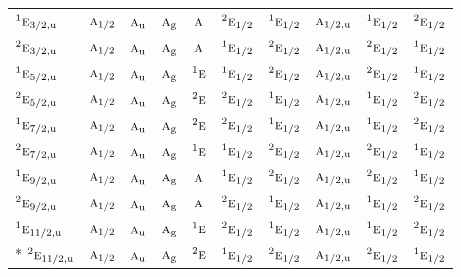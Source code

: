 \documentclass[10pt,a4paper]{article}
\numberwithin{equation}{section}
\newcommand{\irr}[1]{\text{\normalfont\scshape #1}}
\newcommand{\conjpair}[1]{{}^{#1}}
\newcommand{\ptag}[1]{\mathrm{#1}}
\begin{document}
{\begin{longtable}{@{}lccccccccc@{}}
$\conjpair{1}\irr{e}_{3/2,\ptag{u}}$ & $\irr{a}_{1/2}$ & $\irr{a}_{\ptag{u}}$ & $\irr{a}_{\ptag{g}}$ & $\irr{a}$ & $\conjpair{2}\irr{e}_{1/2}$ & $\conjpair{1}\irr{e}_{1/2}$ & $\irr{a}_{1/2,\ptag{u}}$ & $\conjpair{1}\irr{e}_{1/2}$ & $\conjpair{2}\irr{e}_{1/2}$\\
$\conjpair{2}\irr{e}_{3/2,\ptag{u}}$ & $\irr{a}_{1/2}$ & $\irr{a}_{\ptag{u}}$ & $\irr{a}_{\ptag{g}}$ & $\irr{a}$ & $\conjpair{1}\irr{e}_{1/2}$ & $\conjpair{2}\irr{e}_{1/2}$ & $\irr{a}_{1/2,\ptag{u}}$ & $\conjpair{2}\irr{e}_{1/2}$ & $\conjpair{1}\irr{e}_{1/2}$\\
$\conjpair{1}\irr{e}_{5/2,\ptag{u}}$ & $\irr{a}_{1/2}$ & $\irr{a}_{\ptag{u}}$ & $\irr{a}_{\ptag{g}}$ & $\conjpair{1}\irr{e}$ & $\conjpair{1}\irr{e}_{1/2}$ & $\conjpair{2}\irr{e}_{1/2}$ & $\irr{a}_{1/2,\ptag{u}}$ & $\conjpair{2}\irr{e}_{1/2}$ & $\conjpair{1}\irr{e}_{1/2}$\\
$\conjpair{2}\irr{e}_{5/2,\ptag{u}}$ & $\irr{a}_{1/2}$ & $\irr{a}_{\ptag{u}}$ & $\irr{a}_{\ptag{g}}$ & $\conjpair{2}\irr{e}$ & $\conjpair{2}\irr{e}_{1/2}$ & $\conjpair{1}\irr{e}_{1/2}$ & $\irr{a}_{1/2,\ptag{u}}$ & $\conjpair{1}\irr{e}_{1/2}$ & $\conjpair{2}\irr{e}_{1/2}$\\
$\conjpair{1}\irr{e}_{7/2,\ptag{u}}$ & $\irr{a}_{1/2}$ & $\irr{a}_{\ptag{u}}$ & $\irr{a}_{\ptag{g}}$ & $\conjpair{2}\irr{e}$ & $\conjpair{2}\irr{e}_{1/2}$ & $\conjpair{1}\irr{e}_{1/2}$ & $\irr{a}_{1/2,\ptag{u}}$ & $\conjpair{1}\irr{e}_{1/2}$ & $\conjpair{2}\irr{e}_{1/2}$\\
$\conjpair{2}\irr{e}_{7/2,\ptag{u}}$ & $\irr{a}_{1/2}$ & $\irr{a}_{\ptag{u}}$ & $\irr{a}_{\ptag{g}}$ & $\conjpair{1}\irr{e}$ & $\conjpair{1}\irr{e}_{1/2}$ & $\conjpair{2}\irr{e}_{1/2}$ & $\irr{a}_{1/2,\ptag{u}}$ & $\conjpair{2}\irr{e}_{1/2}$ & $\conjpair{1}\irr{e}_{1/2}$\\
$\conjpair{1}\irr{e}_{9/2,\ptag{u}}$ & $\irr{a}_{1/2}$ & $\irr{a}_{\ptag{u}}$ & $\irr{a}_{\ptag{g}}$ & $\irr{a}$ & $\conjpair{1}\irr{e}_{1/2}$ & $\conjpair{2}\irr{e}_{1/2}$ & $\irr{a}_{1/2,\ptag{u}}$ & $\conjpair{2}\irr{e}_{1/2}$ & $\conjpair{1}\irr{e}_{1/2}$\\
$\conjpair{2}\irr{e}_{9/2,\ptag{u}}$ & $\irr{a}_{1/2}$ & $\irr{a}_{\ptag{u}}$ & $\irr{a}_{\ptag{g}}$ & $\irr{a}$ & $\conjpair{2}\irr{e}_{1/2}$ & $\conjpair{1}\irr{e}_{1/2}$ & $\irr{a}_{1/2,\ptag{u}}$ & $\conjpair{1}\irr{e}_{1/2}$ & $\conjpair{2}\irr{e}_{1/2}$\\
$\conjpair{1}\irr{e}_{11/2,\ptag{u}}$ & $\irr{a}_{1/2}$ & $\irr{a}_{\ptag{u}}$ & $\irr{a}_{\ptag{g}}$ & $\conjpair{1}\irr{e}$ & $\conjpair{2}\irr{e}_{1/2}$ & $\conjpair{1}\irr{e}_{1/2}$ & $\irr{a}_{1/2,\ptag{u}}$ & $\conjpair{1}\irr{e}_{1/2}$ & $\conjpair{2}\irr{e}_{1/2}$\\*
$\conjpair{2}\irr{e}_{11/2,\ptag{u}}$ & $\irr{a}_{1/2}$ & $\irr{a}_{\ptag{u}}$ & $\irr{a}_{\ptag{g}}$ & $\conjpair{2}\irr{e}$ & $\conjpair{1}\irr{e}_{1/2}$ & $\conjpair{2}\irr{e}_{1/2}$ & $\irr{a}_{1/2,\ptag{u}}$ & $\conjpair{2}\irr{e}_{1/2}$ & $\conjpair{1}\irr{e}_{1/2}$\\
\bottomrule\end{longtable}}
\end{document}
